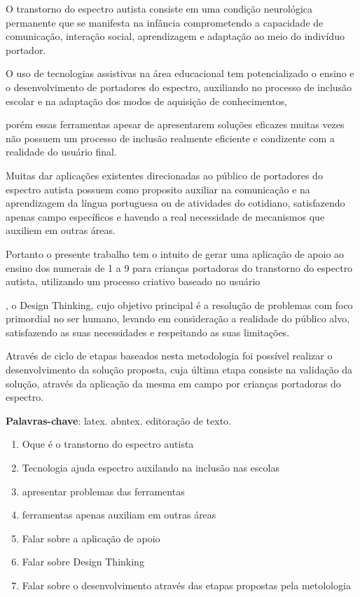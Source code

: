 \setlength{\absparsep}{18pt} %
\begin{resumo}
	O transtorno do espectro autista consiste em uma condição neurológica permanente que se manifesta na infância comprometendo a capacidade de comunicação, interação social, aprendizagem e adaptação ao meio do indivíduo portador. 

	O uso de tecnologias assistivas na área educacional tem potencializado o ensino e o desenvolvimento de portadores do espectro, auxiliando no processo de inclusão escolar e na adaptação dos modos de aquisição de conhecimentos, 

	porém essas ferramentas apesar de apresentarem soluções eficazes muitas vezes não possuem um processo de inclusão realmente eficiente e condizente com a realidade do usuário final. 

	Muitas dar aplicações existentes direcionadas ao público de portadores do espectro autista possuem como proposito auxiliar na comunicação e na aprendizagem da língua portuguesa ou de atividades do cotidiano, satisfazendo apenas campo específicos e havendo a real necessidade de mecanismos que auxiliem em outras áreas.

	Portanto o presente trabalho tem o intuito de gerar uma aplicação de apoio ao ensino dos numerais de 1 a 9 para crianças portadoras do transtorno do espectro autista, utilizando um processo criativo baseado no usuário

	, o Design Thinking, cujo objetivo principal é a resolução de problemas com foco primordial no ser humano, levando em consideração a realidade do público alvo, satisfazendo as suas necessidades e respeitando as suas limitações.  

	Através de ciclo de etapas baseados nesta metodologia foi possível realizar o desenvolvimento da solução proposta, cuja última etapa consiste na validação da solução, através da aplicação da mesma em campo por crianças portadoras do espectro.

	\textbf{Palavras-chave}: latex. abntex. editoração de texto.
	\newpage
	\begin{enumerate}
		\item Oque é o transtorno do espectro autista
		\item Tecnologia ajuda espectro auxilando na inclusão nas escolas
		\item apresentar problemas das ferramentas
		\item ferramentas apenas auxiliam em outras áreas
		\item Falar sobre a aplicação de apoio
		\item Falar sobre Design Thinking
		\item Falar sobre o desenvolvimento através das etapas propostas pela metolologia
	\end{enumerate}



\end{resumo}
